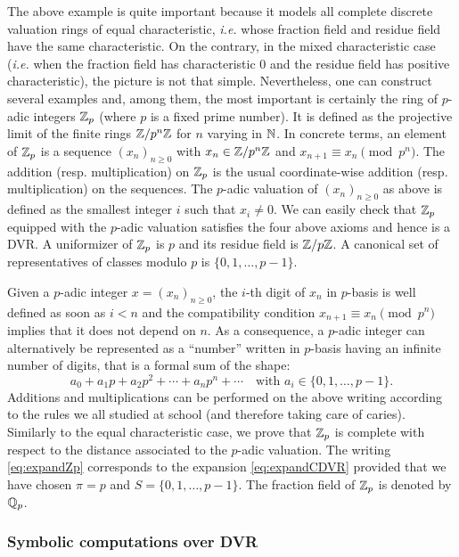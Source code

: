 \documentclass{article}
\begin{document}
\medskip

The above example is quite important because it models all complete 
discrete valuation rings of equal characteristic, \emph{i.e.} whose 
fraction field and residue field have the same characteristic. On the 
contrary, in the mixed characteristic case (\emph{i.e.} when the 
fraction field has characteristic $0$ and the residue field has positive 
characteristic), the picture is not that simple.
Nevertheless, one can construct several examples and, among them, the 
most important is certainly the ring of $p$-adic integers $\mathbb Z_p$ (where 
$p$ is a fixed prime number). It is defined as the projective limit of 
the finite rings $\mathbb Z/p^n\mathbb Z$ for $n$ varying in $\mathbb N$. In concrete terms, 
an element of $\mathbb Z_p$ is a sequence $(x_n)_{n \geq 0}$ with $x_n \in 
\mathbb Z/p^n\mathbb Z$ and $x_{n+1} \equiv x_n \pmod{p^n}$. The addition (resp. 
multiplication) on $\mathbb Z_p$ is the usual coordinate-wise addition (resp. 
multiplication) on the sequences. The $p$-adic valuation of $(x_n)_{n 
\geq 0}$ as above is defined as the smallest integer $i$ such that $x_i 
\neq 0$. We can easily check that $\mathbb Z_p$ equipped with the $p$-adic 
valuation satisfies the four above axioms and hence is a DVR. A
uniformizer of $\mathbb Z_p$ is $p$ and its residue field is $\mathbb Z/p\mathbb Z$. A
canonical set of representatives of classes modulo $p$ is $\{0, 1,
\ldots, p-1\}$.

Given a $p$-adic integer $x = (x_n)_{n \geq 0}$, the $i$-th digit of 
$x_n$ in $p$-basis is well defined as soon as $i<n$ and the 
compatibility condition $x_{n+1} \equiv x_n \pmod{p^n}$ implies that 
it does not depend on $n$. As a consequence, a $p$-adic integer can 
alternatively be represented as a ``number'' written in $p$-basis having 
an infinite number of digits, that is a formal sum of the shape:
\begin{equation}
\label{eq:expandZp}
a_0 + a_1 p + a_2 p^2 + \cdots + a_n p^n + \cdots
\quad \text{with } a_i \in \{0, 1, \ldots, p-1\}.
\end{equation}
Additions and multiplications can be performed on the above writing
according to the rules we all studied at school (and therefore taking
care of caries). Similarly to the equal characteristic case, we prove
that $\mathbb Z_p$ is complete with respect to the distance associated to the 
$p$-adic valuation. The writing \eqref{eq:expandZp} corresponds to the 
expansion \eqref{eq:expandCDVR} provided that we have chosen $\pi = p$ 
and $S = \{0, 1, \ldots, p-1\}$.
The fraction field of $\mathbb Z_p$ is denoted by $\mathbb Q_p$.

\subsubsection{Symbolic computations over DVR}
\label{subsubsec:computDVR}
\end{document}
